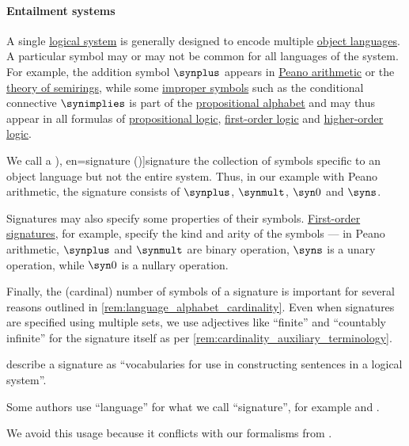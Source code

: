 \paragraph{Entailment systems}

\begin{concept}\label{con:logical_system_signature}
  A single \hyperref[con:logical_system]{logical system} is generally designed to encode multiple \hyperref[con:metalanguage]{object languages}. A particular symbol may or may not be common for all languages of the system. For example, the addition symbol \( {\synplus} \) appears in \hyperref[def:peano_arithmetic]{Peano arithmetic} or the \hyperref[def:semiring/theory]{theory of semirings}, while some \hyperref[con:improper_symbol]{improper symbols} such as the conditional connective \( {\synimplies} \) is part of the \hyperref[def:propositional_alphabet]{propositional alphabet} and may thus appear in all formulas of \hyperref[def:propositional_logic]{propositional logic}, \hyperref[def:first_order_logic]{first-order logic} and \hyperref[def:higher_order_logic]{higher-order logic}.

  We call a \term[ru=сигнатура (логики первого порядка) (\cite[def. 2.1.1]{Герасимов2014Вычислимость}), en=signature (\cite[97]{GoguenBurstall1992Institutions})]{signature} the collection of symbols specific to an object language but not the entire system. Thus, in our example with Peano arithmetic, the signature consists of \( {\synplus} \), \( {\synmult} \), \( \syn0 \) and \( \syns \).

  Signatures may also specify some properties of their symbols. \hyperref[def:fol_signature]{First-order signatures}, for example, specify the kind and arity of the symbols --- in Peano arithmetic, \( {\synplus} \) and \( {\synmult} \) are binary operation, \( \syns \) is a unary operation, while \( \syn0 \) is a nullary operation.

  Finally, the (cardinal) number of symbols of a signature is important for several reasons outlined in \cref{rem:language_alphabet_cardinality}. Even when signatures are specified using multiple sets, we use adjectives like \enquote{finite} and \enquote{countably infinite} for the signature itself as per \cref{rem:cardinality_auxiliary_terminology}.
\end{concept}
\begin{comments}
  \item \Textcite[97]{GoguenBurstall1992Institutions} describe a signature as \enquote{vocabularies for use in constructing sentences in a logical system}.

  \item Some authors use \enquote{language} for what we call \enquote{signature}, for example \textcite[def. 2.1.2]{Hinman2005Logic} and \textcite[270]{Farmer2008STTVirtues}.

  We avoid this usage because it conflicts with our formalisms from .
\end{comments}

